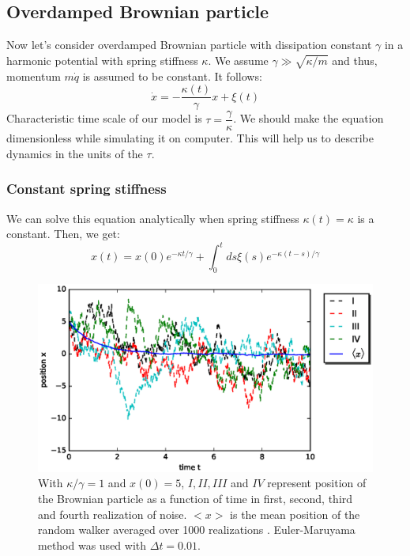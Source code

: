 \documentclass[11pt,a4paper]{article}
\begin{document}
\subsection*{Overdamped Brownian particle}
Now let's consider overdamped Brownian particle with dissipation constant $\gamma$ in a harmonic potential with spring stiffness $\kappa$. We assume $\gamma \gg \sqrt{\kappa/m}$ and thus, momentum $m\dot{q}$ is assumed to be constant. It follows:
\begin{equation}
\dot{x}= -\dfrac{\kappa(t)}{\gamma} x + \xi(t)
\label{eom}
\end{equation}
Characteristic time scale of our model is $\tau=\dfrac{\gamma}{\kappa}$. We should make the equation dimensionless while simulating it on computer. This will help us to describe dynamics in the units of the $\tau$.

\subsubsection*{Constant spring stiffness}
We can solve this equation analytically when spring stiffness $\kappa(t)= \kappa$ is a constant. Then, we get: 
\begin{equation}
x(t)= x(0) e^{-\kappa t/\gamma} + \int_0^t ds  \xi(s) e^{-\kappa (t-s)/\gamma} 
\label{sol}
\end{equation}




\begin{figure}[!htbp]
\centering
\includegraphics[scale=0.67]{x_brown_realization.eps}
\caption{ With $\kappa/\gamma=1$ and $x(0)=5$, $I, II, III$ and $IV$ represent position of the Brownian particle as a function of time in first, second, third and fourth realization of noise. $<x>$ is the mean position of the random walker averaged  over 1000 realizations . Euler-Maruyama method was used with $\Delta t=0.01$. }
\label{meanx_brown}
\end{figure}
\end{document}

